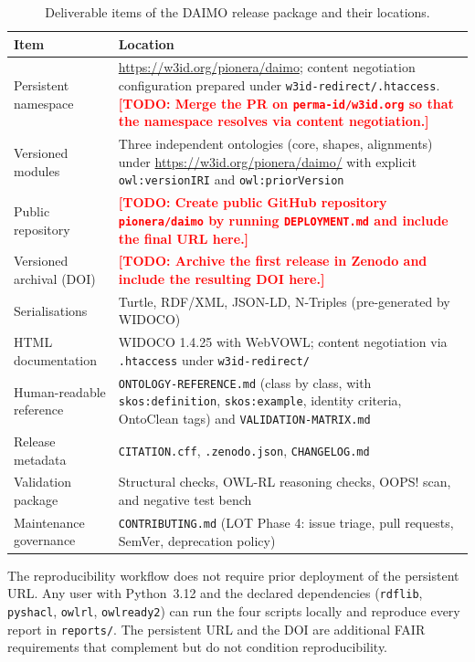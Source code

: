 \documentclass[11pt,a4paper]{article}
\newcommand{\code}[1]{\texttt{#1}}
\newcommand{\TODO}[1]{\textcolor{red}{\textbf{[TODO: #1]}}}
\begin{document}
\begin{table}[h]
\small\sf\centering
\caption{Deliverable items of the DAIMO release package and their locations.\label{tab:avail}}
\begin{tabular}{@{}p{4cm}p{11cm}@{}}
\toprule
\textbf{Item} & \textbf{Location} \\
\midrule
Persistent namespace & \url{https://w3id.org/pionera/daimo}; content negotiation configuration prepared under \code{w3id-redirect/.htaccess}. \TODO{Merge the PR on \texttt{perma-id/w3id.org} so that the namespace resolves via content negotiation.} \\
Versioned modules & Three independent ontologies (core, shapes, alignments) under \url{https://w3id.org/pionera/daimo/} with explicit \code{owl:versionIRI} and \code{owl:priorVersion} \\
Public repository & \TODO{Create public GitHub repository \texttt{pionera/daimo} by running \texttt{DEPLOYMENT.md} and include the final URL here.} \\
Versioned archival (DOI) & \TODO{Archive the first release in Zenodo and include the resulting DOI here.} \\
Serialisations & Turtle, RDF/XML, JSON-LD, N-Triples (pre-generated by WIDOCO) \\
HTML documentation & WIDOCO 1.4.25 with WebVOWL; content negotiation via \code{.htaccess} under \code{w3id-redirect/} \\
Human-readable reference & \code{ONTOLOGY-REFERENCE.md} (class by class, with \code{skos:definition}, \code{skos:example}, identity criteria, OntoClean tags) and \code{VALIDATION-MATRIX.md} \\
Release metadata & \code{CITATION.cff}, \code{.zenodo.json}, \code{CHANGELOG.md} \\
Validation package & Structural checks, OWL-RL reasoning checks, OOPS! scan, and negative test bench \\
Maintenance governance & \code{CONTRIBUTING.md} (LOT Phase 4: issue triage, pull requests, SemVer, deprecation policy) \\
\bottomrule
\end{tabular}
\end{table}

The reproducibility workflow does not require prior deployment of the persistent URL. Any user with Python~3.12 and the declared dependencies (\code{rdflib}, \code{pyshacl}, \code{owlrl}, \code{owlready2}) can run the four scripts locally and reproduce every report in \code{reports/}. The persistent URL and the DOI are additional FAIR requirements that complement but do not condition reproducibility.
\end{document}
